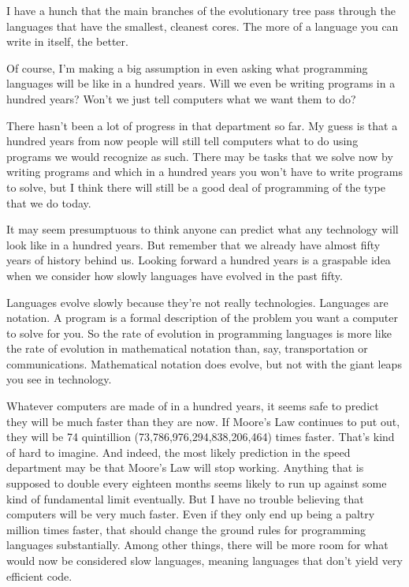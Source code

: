 I have a hunch that
the main branches of the evolutionary tree pass through the languages
that have the smallest, cleanest cores.
The more of a language you can write in itself,
the better.



Of course, I'm making a big assumption in even asking what
programming languages will be like in a hundred years.
Will we even be writing programs in a hundred years?  Won't
we just tell computers what we want them to do?

There hasn't been a lot of progress in that department
so far.
My guess is that a hundred years from now people will
still tell computers what to do using programs we would recognize
as such.  There may be tasks that we
solve now by writing programs and which in a hundred years
you won't have to write programs to solve, but I think
there will still be a good deal of
programming of the type that we do today.

It may seem presumptuous to think anyone can predict what
any technology will look like in a hundred years.  But
remember that we already have almost fifty years of history behind us.
Looking forward a hundred years is a graspable idea
when we consider how slowly languages have evolved in the
past fifty.

Languages evolve slowly because they're not really technologies.
Languages are notation.  A program is a formal description of 
the problem you want a computer to solve for you.  So the rate
of evolution in programming languages is more like the
rate of evolution in mathematical notation than, say,
transportation or communications.
Mathematical notation does evolve, but not with the giant
leaps you see in technology.



Whatever computers are made of in a hundred years, it seems  
safe to predict they will be much faster than
they are now.  If Moore's Law continues to put out, they will be 74
quintillion (73,786,976,294,838,206,464) times faster.  That's kind of
hard to imagine.  And indeed, the most likely prediction in the
speed department may be that Moore's Law will stop working.
Anything that is supposed to double every eighteen months seems
likely to run up against some kind of fundamental limit eventually.
But I have no trouble believing that computers will be very much
faster. Even if they only end up being a paltry million
times faster, that should change the ground rules for programming
languages substantially.  Among other things, there
will be more room for what
would now be considered slow languages, meaning languages
that don't yield very efficient code.

